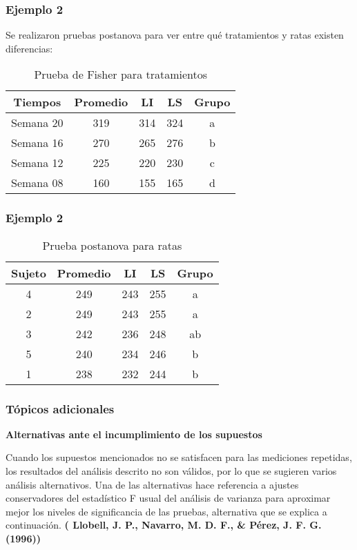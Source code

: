 \documentclass[12pt]{beamer}
\begin{document}
\begin{frame}
\frametitle{Ejemplo 2}
Se realizaron pruebas postanova para ver entre qué tratamientos y ratas existen diferencias:
\begin{table}[htbp]
  \centering
\resizebox{12cm}{!} {
\begin{tabular}{|c|c|c|c|c|}
\hline 
\textbf{Tiempos} & \textbf{Promedio}  & \textbf{LI} & \textbf{LS} & \textbf{Grupo}\\ 
\hline 
Semana 20  &  319&      314  &    324 &    a\\ 
Semana 16  &  270&      265  &    276  &  b\\  
 Semana 12  &  225&   220  &    230 &  c\\   
 Semana 08  &  160&     155  &    165 & d\\    
\hline 
\end{tabular} 
}
\caption{Prueba de Fisher para tratamientos}
\label{tab:addlabel}%
\end{table}%
\end{frame}

\begin{frame}
\frametitle{Ejemplo 2}
\begin{table}[htbp]
  \centering
\resizebox{12cm}{!} {
\begin{tabular}{|c|c|c|c|c|}
\hline 
\textbf{Sujeto} & \textbf{Promedio} & \textbf{LI} & \textbf{LS} & \textbf{Grupo}\\ 
\hline 
4   &    249&     243&      255&  a    \\
 2   &    249&      243&      255&  a    \\
 3   &    242&      236&      248&  ab    \\
  5   &    240&      234&      246&  b  \\  
 1   &    238&       232&      244&  b\\    
\hline 
\end{tabular} 
}
\caption{Prueba postanova para ratas}
\label{tab:addlabel}%
\end{table}%
\end{frame}

\begin{frame}
\frametitle{Tópicos adicionales}
\textbf{Alternativas ante el incumplimiento de los supuestos}

Cuando los supuestos mencionados no se satisfacen para las mediciones repetidas, los resultados
del análisis descrito no son válidos, por lo que se sugieren varios análisis alternativos. Una de las alternativas hace
referencia a ajustes conservadores del estadístico F usual del análisis de varianza para aproximar
mejor los niveles de significancia de las pruebas, alternativa que se explica a continuación.
\textbf{( Llobell, J. P., Navarro, M. D. F., \& Pérez, J. F. G. (1996))}
\end{frame}
\end{document}
